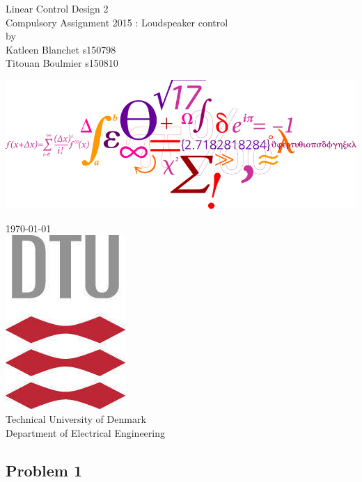 \documentclass[11pt,a4paper,fleqn, onesside]{article}
\begin{document}
\begin{titlepage}
\begin{center}
\vspace{4cm}
\Huge{ Linear Control Design 2}\\
\vspace{0.8cm}
\large{\sc Compulsory Assignment 2015 : Loudspeaker control\\}
\vspace{1.2cm}
\normalsize{by}\\
\vspace{1.2cm}
{\sc
\large Katleen Blanchet s150798  \\ 
Titouan Boulmier s150810\\
}
\vspace{2cm}
\begin{center}
\includegraphics[scale=2.2]{dtulogo2.jpg}
\end{center} 
\vspace{3.1cm}
\normalsize{\today}\\
\vspace{1.37cm}
\includegraphics[scale=0.7]{dtulogo.jpg}\\
\vspace{0.2cm}
\normalsize{Technical University of Denmark \\ Department of Electrical Engineering \\
}
\end{center}
\end{titlepage}
\thispagestyle{empty}

\pagebreak
{}
\setcounter{page}{1}
\setcounter{tocdepth}{4}
\setcounter{secnumdepth}{4} 
\tableofcontents
\newpage
{}


\subsection{Problem 1}




\end{document}

